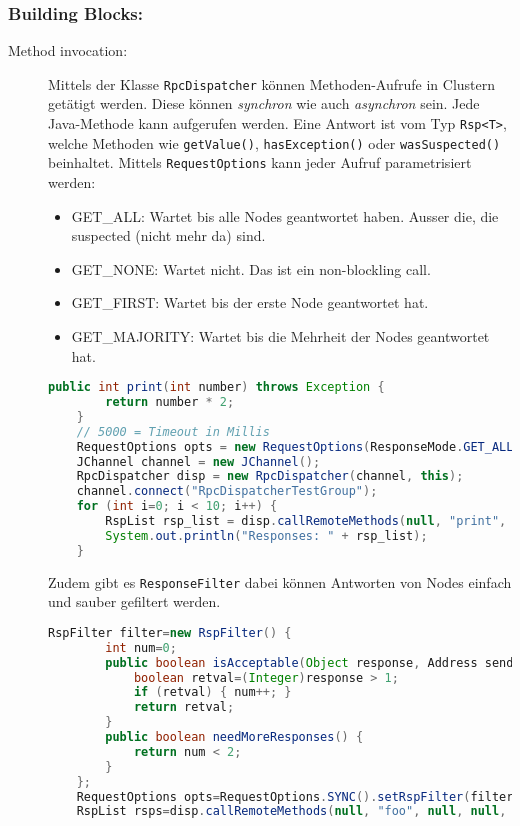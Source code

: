 \subsubsection{Building Blocks:}
\begin{description}
	\item[Method invocation:] Mittels der Klasse \verb|RpcDispatcher| können Methoden-Aufrufe in Clustern getätigt werden. Diese können \emph{synchron} wie auch \emph{asynchron} sein. Jede Java-Methode kann aufgerufen werden. Eine Antwort ist vom Typ \verb|Rsp<T>|, welche Methoden wie \verb|getValue()|, \verb|hasException()| oder \verb|wasSuspected()| beinhaltet. Mittels \verb|RequestOptions| kann jeder Aufruf parametrisiert werden:
	
	\begin{itemize}
		\item GET\_ALL: Wartet bis alle Nodes geantwortet haben. Ausser die, die suspected (nicht mehr da) sind.
		\item GET\_NONE: Wartet nicht. Das ist ein non-blockling call.
		\item GET\_FIRST: Wartet bis der erste Node geantwortet hat.
		\item GET\_MAJORITY: Wartet bis die Mehrheit der Nodes geantwortet hat.
	\end{itemize}
	
	\begin{lstlisting}[language=Java]
	public int print(int number) throws Exception {
		return number * 2;
	} 
	// 5000 = Timeout in Millis
	RequestOptions opts = new RequestOptions(ResponseMode.GET_ALL, 5000);
	JChannel channel = new JChannel();
	RpcDispatcher disp = new RpcDispatcher(channel, this);
	channel.connect("RpcDispatcherTestGroup");
	for (int i=0; i < 10; i++) {
		RspList rsp_list = disp.callRemoteMethods(null, "print", new Object[]{i}, new Class[]{int.class}, opts);
		System.out.println("Responses: " + rsp_list);
	}
	\end{lstlisting}
	
	Zudem gibt es \verb|ResponseFilter| dabei können Antworten von Nodes einfach und sauber gefiltert werden.
	
	\begin{lstlisting}[language=Java]
	RspFilter filter=new RspFilter() {
		int num=0;
		public boolean isAcceptable(Object response, Address sender) {
			boolean retval=(Integer)response > 1;
			if (retval) { num++; }
			return retval;
		}
		public boolean needMoreResponses() {
			return num < 2;
		}
	};
	RequestOptions opts=RequestOptions.SYNC().setRspFilter(filter);
	RspList rsps=disp.callRemoteMethods(null, "foo", null, null, opts);
	\end{lstlisting}
	

\end{description}
